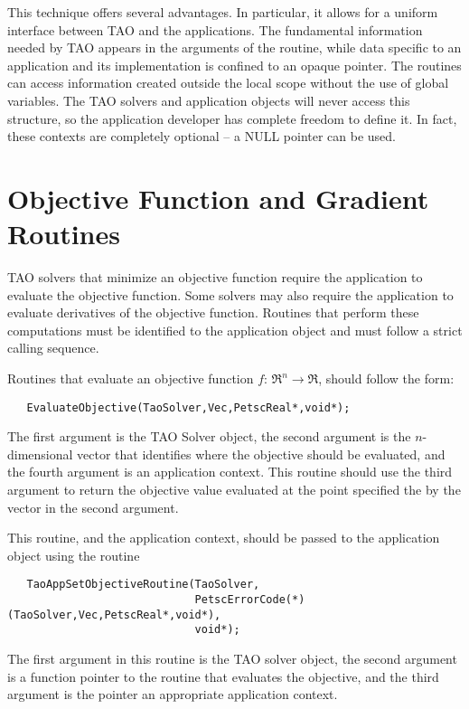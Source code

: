 This technique offers several advantages.
In particular, it allows for a uniform interface between TAO and 
the applications.   The fundamental information needed by TAO 
appears in the arguments of the routine, while data specific to an application
and its implementation is confined to an opaque pointer.
The routines can access information created outside the 
local scope without the use of global variables.
The TAO solvers and application objects will never access this structure, 
so the application developer has complete freedom to define it.  In fact,
these contexts are completely optional -- a NULL pointer can be used.



\section{Objective Function and Gradient Routines}\label{sec:fghj}

TAO solvers that minimize an objective function require
the application to evaluate the objective function.  Some solvers
may also require the application to evaluate
derivatives of the objective function.  
Routines that perform these computations must be identified
to the application object and must follow a strict calling sequence.

Routines that evaluate an objective function $f: \, \Re^n \to \Re$,
should follow the form:
\begin{verbatim}
   EvaluateObjective(TaoSolver,Vec,PetscReal*,void*);
\end{verbatim}
\noindent
The first argument is the TAO Solver object, the second argument is the
$n$-dimensional vector that identifies where the objective should be evaluated, 
and the fourth argument is an application context.
This routine should use the third argument to return the objective value 
evaluated at the point
specified the by the vector in the second argument.

This routine, and the application context, should be passed to the 
application object using
the routine 
\begin{verbatim}
   TaoAppSetObjectiveRoutine(TaoSolver,
                             PetscErrorCode(*)(TaoSolver,Vec,PetscReal*,void*),
                             void*);
\end{verbatim}
\noindent
The first argument in this routine is the TAO solver object, 
the second argument is a function pointer to the routine that 
evaluates the objective, and the third
argument is the pointer an appropriate application context.  

